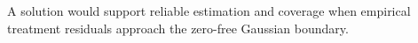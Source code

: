 A solution would support reliable estimation and coverage when empirical treatment residuals approach the zero-free Gaussian boundary.